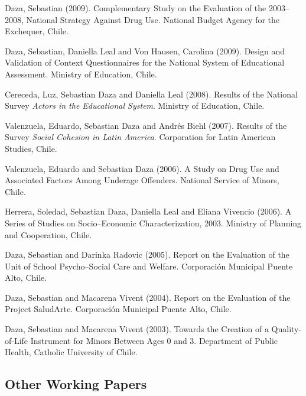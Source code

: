 \documentclass[10pt,letterpaper]{article}
\renewenvironment{itemize}{
  \begin{list}{}{
    \setlength{\leftmargin}{1.5em}
    \setlength{\itemsep}{0.25em}
    \setlength{\parskip}{0pt}
    \setlength{\parsep}{0.25em}
  }
}{
  \end{list}
}
\begin{document}
\begin{itemize}

\item Daza, Sebastian (2009). Complementary Study on the Evaluation of the 2003--2008, National Strategy Against Drug Use. National Budget Agency for the Exchequer, Chile.
\item Daza, Sebastian, Daniella Leal and Von Hausen, Carolina (2009). Design and Validation of Context Questionnaires for the National System of Educational Assessment. Ministry of Education, Chile.
\item Cereceda, Luz, Sebastian Daza and Daniella Leal (2008). Results of the National Survey \textit{Actors in the Educational System}. Ministry of Education, Chile.
\item Valenzuela, Eduardo, Sebastian Daza and Andrés Biehl (2007). Results of the Survey \textit{Social Cohesion in Latin America}. Corporation for Latin American Studies, Chile.
\item Valenzuela, Eduardo and Sebastian Daza (2006). A Study on Drug Use and Associated Factors Among Underage Offenders. National Service of Minors, Chile.
\item Herrera, Soledad, Sebastian Daza, Daniella Leal and Eliana Vivencio (2006). A Series of Studies on Socio--Economic Characterization, 2003. Ministry of Planning and Cooperation, Chile.
\item Daza, Sebastian and Darinka Radovic (2005). Report on the Evaluation of the Unit of School Psycho--Social Care and Welfare. Corporación Municipal Puente Alto, Chile.
\item Daza, Sebastian and  Macarena Vivent (2004). Report on the Evaluation of the Project SaludArte. Corporación Municipal Puente Alto, Chile.
\item Daza, Sebastian and Macarena Vivent (2003). Towards the Creation of a Quality-of-Life Instrument for Minors Between Ages 0 and 3. Department of Public Health, Catholic University of Chile.


\end{itemize}

\subsection*{Other Working Papers}
\end{document}
